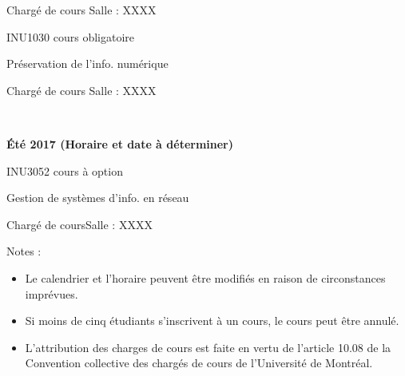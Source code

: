 \documentclass [12 pt]{article}
\begin{document}
                                Chargé de cours
                                Salle : XXXX
                            
                            
                                
                                    INU1030 cours obligatoire
                                
                                
                                    Préservation de l'info. numérique
                                
                                Chargé de cours
                                Salle : XXXX
                            
                             
                        
                    
                
            
            
        \textbf{
        Été 2017 (Horaire et date à déterminer)
        }
    
            
                INU3052 cours à option
            
            
                Gestion de systèmes d'info. en réseau
            
            Chargé de coursSalle : XXXX
            
                
                    
                
            
            Notes :
            
        \begin{itemize}
        
                
        \item Le calendrier et l'horaire peuvent être modifiés en raison de circonstances
                    imprévues.
                
        \item Si moins de cinq étudiants s'inscrivent à un cours, le cours peut être
                    annulé.
                
        \item L'attribution des charges de cours est faite en vertu de l'article 10.08 de la
                    Convention collective des chargés de cours de l'Université de Montréal.
            
        \end{itemize}
    
        
        
\end{document}
